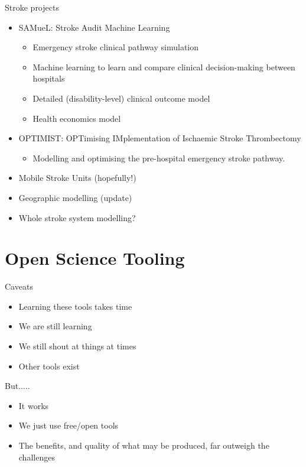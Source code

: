 \documentclass[xcolor={usenames,dvipsnames}]{beamer}
\begin{document}
\begin{frame}{Stroke projects}

\begin{itemize}
    \setlength\itemsep{2.5mm}
    \item SAMueL: Stroke Audit Machine Learning 
    \begin{itemize}
        \item Emergency stroke clinical pathway simulation
        \item Machine learning to learn and compare clinical decision-making between hospitals
        \item Detailed (disability-level) clinical outcome model
        \item Health economics model
    \end{itemize}
    \item OPTIMIST: OPTimising IMplementation of Ischaemic Stroke Thrombectomy
        \begin{itemize}
            \item Modelling and optimising the pre-hospital emergency stroke pathway.
        \end{itemize}
    \item Mobile Stroke Units (hopefully!)
    \item Geographic modelling (update)
    \item Whole stroke system modelling?
\end{itemize}
    
\end{frame}


\section{Open Science Tooling}

\begin{frame}{Caveats}

\begin{itemize}
    \setlength\itemsep{2mm}
    \item Learning these tools takes time
    \item We are still learning
    \item We still shout at things at times
    \item Other tools exist
\end{itemize}

\vspace{4mm}
But.....
\vspace{4mm}

\begin{itemize}
    \setlength\itemsep{2mm}
    \item It works
    \item We just use free/open tools
    \item The benefits, and quality of what may be produced, far outweigh the challenges
\end{itemize}

\end{frame}
\end{document}
